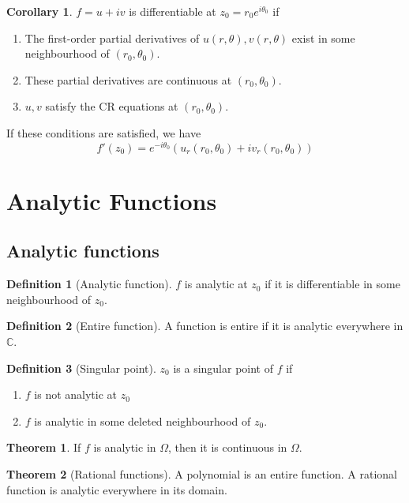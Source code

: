 \documentclass[10pt, a4paper]{extarticle}
\theoremstyle{definition}
\newtheorem{thm}{Theorem}
\newtheorem{cor}{Corollary}[thm]
\newtheorem{defn}{Definition}
\begin{document}
	\begin{cor}
		$f=u+iv$ is differentiable at $z_0=r_0e^{i\theta_0}$ if
		\begin{enumerate}
			\item The first-order partial derivatives of $u(r,\theta),v(r,\theta)$ exist in some neighbourhood of $(r_0,\theta_0)$.
			\item These partial derivatives are continuous at $(r_0,\theta_0)$.
			\item $u,v$ satisfy the CR equations at $(r_0,\theta_0)$.
	\end{enumerate}
	If these conditions are satisfied, we have
	\[f'(z_0)=e^{-i\theta_0}(u_r(r_0,\theta_0)+iv_r(r_0,\theta_0))\]
	\end{cor}

	\section{Analytic Functions}
	\subsection{Analytic functions}
	\begin{defn}[Analytic function]
		$f$ is analytic at $z_0$ if it is differentiable in some neighbourhood of $z_0$.
	\end{defn}

	\begin{defn}[Entire function]
		A function is entire if it is analytic everywhere in $\mathbb{C}$.
	\end{defn}

	\begin{defn}[Singular point]
		$z_0$ is a singular point of $f$ if
		\begin{enumerate}
			\item $f$ is not analytic at $z_0$
			\item $f$ is analytic in some deleted neighbourhood of $z_0$.
	\end{enumerate}
	\end{defn}

	\begin{thm}
		If $f$ is analytic in $\Omega$, then it is continuous in $\Omega$.
	\end{thm}

	\begin{thm}[Rational functions]
		A polynomial is an entire function. A rational function is analytic everywhere in its domain.
	\end{thm}
\end{document}
